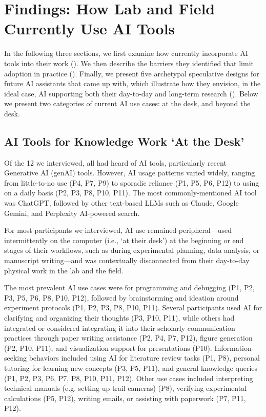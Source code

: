 \section{Findings: How Lab and Field  Currently Use AI Tools}
\label{sec:usecases}

In the following three sections, we first examine how  currently incorporate AI tools into their work (). We then describe the barriers they identified that limit adoption in practice (). Finally, we present five archetypal speculative designs for future AI assistants that  came up with, which illustrate how they envision, in the ideal case, AI supporting both their day-to-day and long-term research (). Below we present two categories of current AI use cases: at the desk, and beyond the desk.


\subsection{AI Tools for Knowledge Work `At the Desk'}

Of the 12  we interviewed, all had heard of AI tools, particularly recent Generative AI (genAI) tools. However, AI usage patterns varied widely, ranging from little-to-no use (P4, P7, P9) to sporadic reliance (P1, P5, P6, P12) to using on a daily basis (P2, P3, P8, P10, P11). The most commonly-mentioned AI tool was ChatGPT, followed by other text-based LLMs such as Claude, Google Gemini, and Perplexity AI-powered search.

For most participants we interviewed, AI use remained peripheral---used intermittently on the computer (i.e., `at their desk') at the beginning or end stages of their workflows, such as during experimental planning, data analysis, or manuscript writing---and was contextually disconnected from their day-to-day physical work in the lab and the field.

The most prevalent AI use cases were for programming and debugging (P1, P2, P3, P5, P6, P8, P10, P12), followed by brainstorming and ideation around experiment protocols (P1, P2, P3, P8, P10, P11). Several participants used AI for clarifying and organizing their thoughts (P3, P10, P11), while others had integrated or considered integrating it into their scholarly communication practices through paper writing assistance (P2, P4, P7, P12), figure generation (P2, P10, P11), and visualization support for presentations (P10). Information-seeking behaviors included using AI for literature review tasks (P1, P8), personal tutoring for learning new concepts (P3, P5, P11), and general knowledge queries (P1, P2, P3, P6, P7, P8, P10, P11, P12). Other use cases included interpreting technical manuals (e.g. setting up trail cameras) (P8), verifying experimental calculations (P5, P12), writing emails, or assisting with paperwork (P7, P11, P12).


